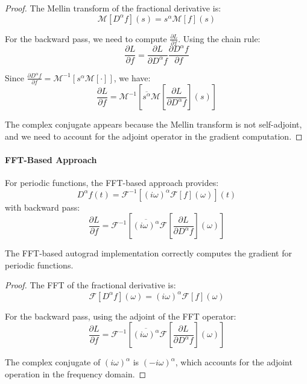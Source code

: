 \begin{proof}
The Mellin transform of the fractional derivative is:
\begin{equation}
\mathcal{M}[D^{\alpha} f](s) = s^{\alpha} \mathcal{M}[f](s)
\end{equation}

For the backward pass, we need to compute $\frac{\partial L}{\partial f}$. Using the chain rule:
\begin{equation}
\frac{\partial L}{\partial f} = \frac{\partial L}{\partial D^{\alpha}f} \frac{\partial D^{\alpha}f}{\partial f}
\end{equation}

Since $\frac{\partial D^{\alpha}f}{\partial f} = \mathcal{M}^{-1}[s^{\alpha} \mathcal{M}[\cdot]]$, we have:
\begin{equation}
\frac{\partial L}{\partial f} = \mathcal{M}^{-1}\left[\overline{s^{\alpha}} \mathcal{M}\left[\frac{\partial L}{\partial D^{\alpha}f}\right](s)\right]
\end{equation}

The complex conjugate appears because the Mellin transform is not self-adjoint, and we need to account for the adjoint operator in the gradient computation.
\end{proof}

\paragraph{FFT-Based Approach}

For periodic functions, the FFT-based approach provides:
\begin{equation}
D^{\alpha} f(t) = \mathcal{F}^{-1}[(i\omega)^{\alpha} \mathcal{F}[f](\omega)](t)
\end{equation}
with backward pass:
\begin{equation}
\frac{\partial L}{\partial f} = \mathcal{F}^{-1}\left[\overline{(i\omega)^{\alpha}} \mathcal{F}\left[\frac{\partial L}{\partial D^{\alpha}f}\right](\omega)\right]
\end{equation}

\begin{theorem}
The FFT-based autograd implementation correctly computes the gradient for periodic functions.
\end{theorem}

\begin{proof}
The FFT of the fractional derivative is:
\begin{equation}
\mathcal{F}[D^{\alpha} f](\omega) = (i\omega)^{\alpha} \mathcal{F}[f](\omega)
\end{equation}

For the backward pass, using the adjoint of the FFT operator:
\begin{equation}
\frac{\partial L}{\partial f} = \mathcal{F}^{-1}\left[\overline{(i\omega)^{\alpha}} \mathcal{F}\left[\frac{\partial L}{\partial D^{\alpha}f}\right](\omega)\right]
\end{equation}

The complex conjugate of $(i\omega)^{\alpha}$ is $(-i\omega)^{\alpha}$, which accounts for the adjoint operation in the frequency domain.
\end{proof}

